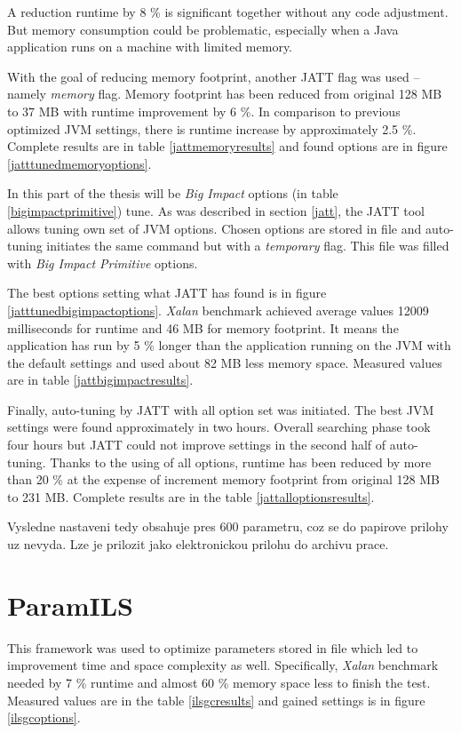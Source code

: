 \documentclass[
  digital, %
  oneside,
  notable, %
  nolof,     %
  nolot     %
]{fithesis3}
\begin{document}
A reduction runtime by 8 \% is significant together without any code adjustment. But memory consumption could be problematic, especially when a Java application runs on a machine with limited memory.

With the goal of reducing memory footprint, another JATT flag was used -- namely \textit{memory} flag. Memory footprint has been reduced from original 128 MB to 37 MB with runtime improvement by 6 \%. In comparison to previous optimized JVM settings, there is runtime increase by approximately 2.5 \%.  Complete results are in table \ref{jattmemoryresults} and found options are in figure \ref{jatttunedmemoryoptions}.

In this part of the thesis will be \textit{Big Impact} options (in table \ref{bigimpactprimitive}) tune. As was described in section \ref{jatt}, the JATT tool allows tuning own set of JVM options. Chosen options are stored in \texttt{} file and auto-tuning initiates the same command but with a \textit{temporary} flag. This file was filled with \textit{Big Impact Primitive} options.

The best options setting what JATT has found is in figure \ref{jatttunedbigimpactoptions}. \textit{Xalan} benchmark achieved average values 12009 milliseconds for runtime and 46 MB for memory footprint. It means the application has run by 5 \% longer than the application running on the JVM with the default settings and used about 82 MB less memory space. Measured values are in table \ref{jattbigimpactresults}.

Finally, auto-tuning by JATT with all option set was initiated. The best JVM settings were found approximately in two hours. Overall searching phase took four hours but JATT could not improve settings  in the second half of auto-tuning. Thanks to the using of all options, runtime has been reduced by more than 20 \% at the expense of increment memory footprint from original 128 MB to 231 MB. Complete results are in the table \ref{jattalloptionsresults}.

{\color{red} Vysledne nastaveni tedy obsahuje pres 600 parametru, coz se do papirove prilohy uz nevyda. Lze je prilozit jako elektronickou prilohu do archivu prace.}

\section{ParamILS}
This framework was used to optimize parameters stored in \texttt{} file which led to improvement time and space complexity as well. Specifically, \textit{Xalan} benchmark needed by 7 \% runtime and almost 60 \% memory space less to finish the test. Measured values are in the table \ref{ilsgcresults} and gained settings is in figure \ref{ilsgcoptions}.
\end{document}
